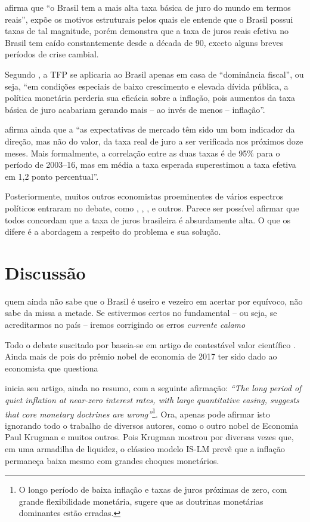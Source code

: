 \documentclass[
	10pt,				%
	openright,			%
	twoside,			%
	a5paper,			%
	english,			%
	french,				%
	spanish,			%
	brazil				%
	]{abntex2}
\renewenvironment{quote}
  {\small\list{}{\rightmargin=0.1cm \leftmargin=4cm}%
   \item\relax}
  {\endlist}
\begin{document}
 afirma que ``o Brasil tem a mais alta taxa básica de
juro do mundo em termos reais'', expõe os motivos estruturais pelos
quais ele entende que o Brasil possui taxas de tal magnitude, porém
demonstra que a taxa de juros reais efetiva no Brasil tem caído
constantemente desde a década de 90, exceto alguns breves períodos de
crise cambial.

Segundo , a TFP se aplicaria ao Brasil apenas
em casa de ``dominância fiscal'', ou seja, ``em condições especiais de
baixo crescimento e elevada dívida pública, a política monetária
perderia sua eficácia sobre a inflação, pois aumentos da taxa básica de
juro acabariam gerando mais -- ao invés de menos -- inflação''.

 afirma ainda que a ``as expectativas de
mercado têm sido um bom indicador da direção, mas não do valor, da taxa
real de juro a ser verificada nos próximos doze meses. Mais formalmente,
a correlação entre as duas taxas é de 95\% para o período de 2003--16,
mas em média a taxa esperada superestimou a taxa efetiva em 1,2 ponto
percentual''.

Posteriormente, muitos outros economistas proeminentes de vários
espectros políticos entraram no debate, como ,
, ,
 e outros. Parece ser possível afirmar que
todos concordam que a taxa de juros brasileira é absurdamente alta. O
que os difere é a abordagem a respeito do problema e sua solução.

\chapter{Discussão}\label{discussuxe3o}

\begin{quote}
quem ainda não sabe que o Brasil é useiro e vezeiro em acertar por
equívoco, não sabe da missa a metade. Se estivermos certos no
fundamental -- ou seja, se acreditarmos no país -- iremos corrigindo os
erros \emph{currente calamo} \cite[p.~]{rangel1987a}
\end{quote}

Todo o debate suscitado por  baseia-se em artigo de
contestável valor científico \cite{cochrane}. Ainda mais de pois do
prêmio nobel de economia de 2017 ter sido dado ao economista que
questiona

 inicia seu artigo, ainda no resumo, com a
seguinte afirmação: \emph{``The long period of quiet inflation at
near-zero interest rates, with large quantitative easing, suggests that
core monetary doctrines are wrong''}\footnote{O longo período de baixa
  inflação e taxas de juros próximas de zero, com grande flexibilidade
  monetária, sugere que as doutrinas monetárias dominantes estão
  erradas.}. Ora,  apenas pode afirmar isto
ignorando todo o trabalho de diversos autores, como o outro nobel de
Economia Paul Krugman e muitos outros. Pois Krugman mostrou por diversas
vezes que, em uma armadilha de liquidez, o clássico modelo IS-LM prevê
que a inflação permaneça baixa mesmo com grandes choques monetários.
\end{document}
